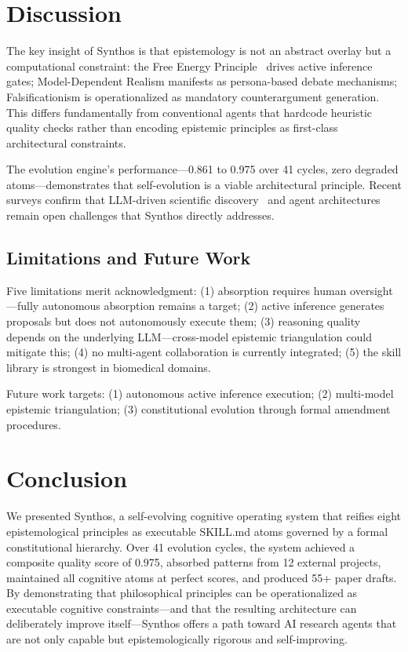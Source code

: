 \documentclass[review]{elsarticle}
\begin{document}
\section{Discussion}

The key insight of Synthos is that epistemology is not an abstract overlay but a computational constraint: the Free Energy Principle~\cite{friston2010free} drives active inference gates; Model-Dependent Realism manifests as persona-based debate mechanisms; Falsificationism is operationalized as mandatory counterargument generation. This differs fundamentally from conventional agents that hardcode heuristic quality checks rather than encoding epistemic principles as first-class architectural constraints.

The evolution engine's performance---0.861 to 0.975 over 41 cycles, zero degraded atoms---demonstrates that self-evolution is a viable architectural principle. Recent surveys confirm that LLM-driven scientific discovery~\cite{gao2024scientific} and agent architectures~\cite{wang2024surveyagent,xi2023rise} remain open challenges that Synthos directly addresses.

\subsection{Limitations and Future Work}
\label{sec:limitations}

Five limitations merit acknowledgment: (1) absorption requires human oversight---fully autonomous absorption remains a target; (2) active inference generates proposals but does not autonomously execute them; (3) reasoning quality depends on the underlying LLM---cross-model epistemic triangulation could mitigate this; (4) no multi-agent collaboration is currently integrated; (5) the skill library is strongest in biomedical domains.

Future work targets: (1) autonomous active inference execution; (2) multi-model epistemic triangulation; (3) constitutional evolution through formal amendment procedures.

\section{Conclusion}

We presented Synthos, a self-evolving cognitive operating system that reifies eight epistemological principles as executable SKILL.md atoms governed by a formal constitutional hierarchy. Over 41 evolution cycles, the system achieved a composite quality score of 0.975, absorbed patterns from 12 external projects, maintained all cognitive atoms at perfect scores, and produced 55+ paper drafts. By demonstrating that philosophical principles can be operationalized as executable cognitive constraints---and that the resulting architecture can deliberately improve itself---Synthos offers a path toward AI research agents that are not only capable but epistemologically rigorous and self-improving.
\end{document}
